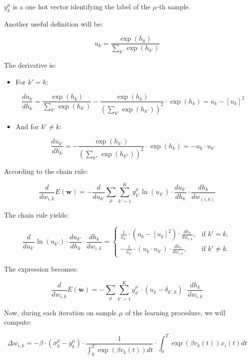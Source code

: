 \(y_k^{\mu}\) is a one hot vector identifying the label of the \(\mu\)-th sample.

Another useful definition will be:

\begin{equation}
    u_k = \frac{\exp(h_k)}{\sum_{k'} \exp(h_{k'})}
\end{equation}

The derivative is: \\
\begin{itemize}
    \item For \(k'=k\):

\begin{equation}
    \frac{du_k}{dh_k} = \frac{\exp(h_k)}{\sum_{k'} \exp(h_{k'})} - \frac{\exp(h_k)}{\left(\sum_{k'} \exp(h_{k'})\right)^2} \cdot \exp(h_k) = u_k - [u_k]^2
\end{equation}

\item And for \(k' \neq k\):

\begin{equation}
    \frac{du_{k'}}{dh_k} = -\frac{\exp(h_{k'})}{\left(\sum_{k''} \exp(h_{k''})\right)^2} \cdot \exp(h_k) = -u_k \cdot u_{k'}
\end{equation}
\end{itemize}

According to the chain rule:

\begin{equation}
    \frac{d}{dw_{i,k}} E(\mathbf{w}) = -\frac{d}{du_{k'}} \sum_{\mu} \sum_{k'=1}^K y_{k'}^{\mu} \ln(u_{k'}) \cdot \frac{du_{k'}}{dh_k} \cdot \frac{dh_k}{dw_{(i,k)}}
\end{equation}

The chain rule yields:

\begin{equation}
    \frac{d}{du_{k'}} \ln(u_{k'}) \cdot \frac{du_{k'}}{dh_k} \cdot \frac{dh_k}{dw_{i,k}} = \begin{cases}
    \frac{1}{u_{k'}} \cdot (u_k - [u_k]^2) \cdot \frac{dh_k}{dw_{i,k}}, & \text{if } k' = k, \\
    -\frac{1}{u_{k'}} \cdot (u_k \cdot u_{k'}) \cdot \frac{dh_k}{dw_{i,k}}, & \text{if } k' \neq k.
    \end{cases}
\end{equation}

The expression becomes:

\begin{equation}
    \frac{d}{dw_{i,k}} E(\mathbf{w}) = -\sum_{\mu} \sum_{k'=1}^K y_{k'}^{\mu} \cdot (u_k - \delta_{k',k}) \cdot \frac{dh_k}{dw_{i,k}}
\end{equation}

Now, during each iteration on sample \(\mu\) of the learning procedure, we will compute:

\begin{equation}
    \Delta w_{i,k} = -\beta \cdot (\sigma_k^{\mu} - y_k^{\mu}) \cdot \frac{1}{\int_0^T \exp(\beta v_k(t)) dt} \cdot \int_0^T \exp(\beta v_k(t)) x_i(t) dt
\end{equation}
